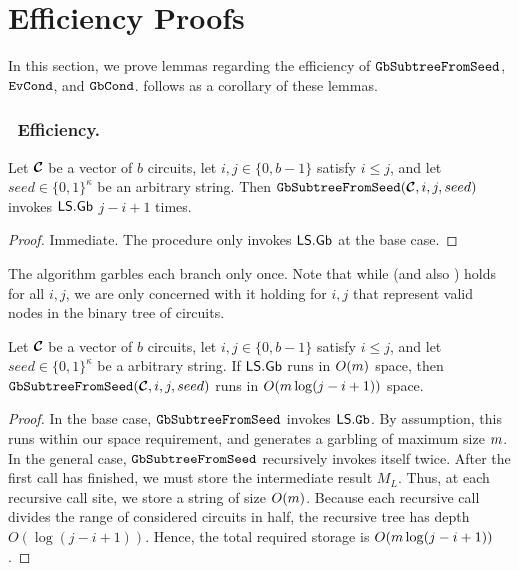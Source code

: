 \section{Efficiency Proofs}\label{supp:effproofs}

In this section, we prove lemmas regarding the efficiency of
$\mathtt{GbSubtreeFromSeed}$, $\mathtt{EvCond}$, and $\mathtt{GbCond}$.
 follows as a corollary of these lemmas.

\subsubsection{\gbtree\ Efficiency.}

\begin{lemma}\label{lemma:gbtreetime}
  Let $\vec{\cir}$ be a vector of $b$ circuits,
  let $i, j \in \{0, b-1\}$ satisfy $i \leq j$,
  and let $seed \in \{0, 1\}^\kappa$ be an arbitrary string.
  Then $\gbtree(\vec \cir, i, j, seed)$ invokes $\textsf{LS}.\textsf{Gb}$ $j - i + 1$ times.
\end{lemma}
\begin{proof}
  Immediate. The procedure only invokes $\textsf{LS}.\textsf{Gb}$ at the base case.
\end{proof}
The algorithm garbles each branch only once.
Note that while  (and also
) holds for all $i, j$, we are
only concerned with it holding for $i, j$ that represent valid nodes
in the binary tree of circuits.


\begin{lemma}\label{lemma:gbtreespace}
  Let $\vec{\cir}$ be a vector of $b$ circuits,
  let $i, j \in \{0, b-1\}$ satisfy $i \leq j$,
  and let $seed \in \{0, 1\}^\kappa$ be a arbitrary string.
  If $\textsf{LS}.\mathsf{Gb}$ runs in $O(m)$ space,
  then $\gbtree(\vec \cir, i, j, seed)$ runs in $O(m \log (j-i+1))$ space.
\end{lemma}
\begin{proof}
  In the base case, $\mathtt{GbSubtreeFromSeed}$ invokes $\textsf{LS}.\mathtt{Gb}$. By assumption, this runs
  within our space requirement, and generates a garbling of maximum
  size $m$.
  In the general case, $\mathtt{GbSubtreeFromSeed}$ recursively invokes itself twice.
  After the first call has finished, we must store the
  intermediate result $M_L$.
  Thus, at each recursive call site, we store a string of size
  $O(m)$.
  Because each recursive call divides the range of considered circuits
  in half, the recursive tree has depth $O(\log(j-i+1))$.
  Hence, the total required storage is $O(m \log(j-i+1))$.
\end{proof}



